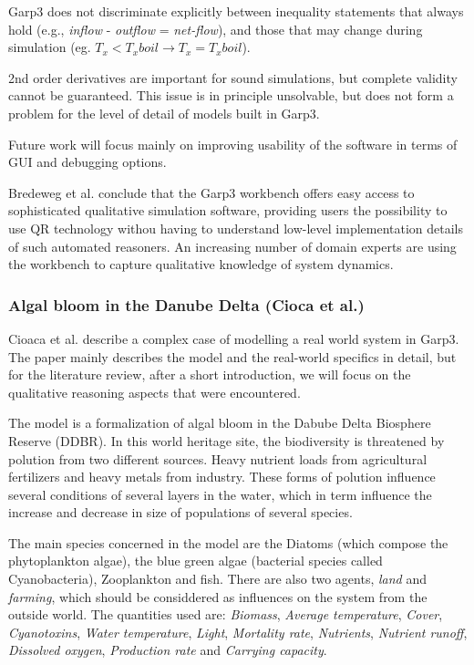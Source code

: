 \documentclass{article} %
\begin{document}
Garp3 does not discriminate explicitly between inequality statements that
always hold (e.g., \emph{inflow} - \emph{outflow} = 
\emph{net-flow}), and those that may change during simulation 
(eg. $T_x < T_xboil \rightarrow T_x = T_xboil$).

\vspace{0.8em}

2nd order derivatives are important for sound simulations, but complete
validity cannot be guaranteed. This issue is in principle unsolvable, but does
not form a problem for the level of detail of models built in Garp3.  

Future work will focus mainly on improving usability of the software in terms
of GUI and debugging options.

Bredeweg et al. conclude that the Garp3 workbench offers easy access to 
sophisticated qualitative simulation software, providing users the 
possibility to use QR technology withou having to understand low-level 
implementation details of such automated reasoners. An increasing number of 
domain experts are using the workbench to capture qualitative knowledge of 
system dynamics.  

\subsubsection{Algal bloom in the Danube Delta (Cioca et al.)}
\label{sec:litrev_qr_cioca}
Cioaca et al. describe a complex case of modelling a real world system in Garp3.
The paper mainly describes the model and the real-world specifics in detail, but 
for the literature review, after a short introduction, we will focus on the 
qualitative reasoning aspects that were encountered.

\vspace{0.8em}

The model is a formalization of algal bloom in the Dabube Delta Biosphere
Reserve (DDBR). In this world heritage site, the biodiversity is threatened by
polution from two different sources. Heavy nutrient loads from agricultural 
fertilizers and heavy metals from industry. These forms of polution
influence several conditions of several layers in the water, which in term
influence the increase and decrease in size of populations of several species.

The main species concerned in the model are the Diatoms (which compose the
phytoplankton algae), the blue green algae (bacterial species called
Cyanobacteria), Zooplankton and fish. There are also two agents, \emph{land} and
\emph{farming}, which should be considdered as influences on the system from the
outside world. The quantities used are: \emph{Biomass}, \emph{Average
temperature}, \emph{Cover}, \emph{Cyanotoxins}, \emph{Water temperature},
\emph{Light}, \emph{Mortality rate}, \emph{Nutrients}, \emph{Nutrient runoff},
\emph{Dissolved oxygen}, \emph{Production rate} and \emph{Carrying capacity}.
\end{document}
